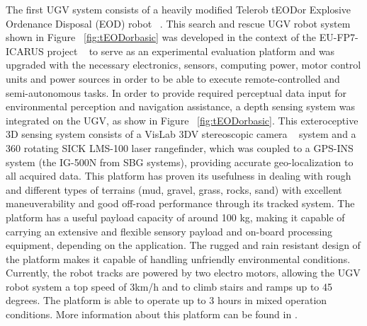 \documentclass{article}
\begin{document}
The first UGV system consists of a heavily modified Telerob tEODor Explosive Ordenance Disposal (EOD) robot ~\cite{EODTeodor}.
This search and rescue UGV robot system shown in Figure ~\ref{fig:tEODorbasic} was developed in the context of the EU-FP7-ICARUS project ~\cite{ICARUS} to serve as an experimental evaluation platform and was upgraded with the necessary  electronics,  sensors, computing power, motor control units and power sources in order to be able to execute remote-controlled and semi-autonomous tasks.
In order to provide required perceptual data input for environmental perception and navigation assistance, a depth sensing system was integrated on the UGV, as show in Figure ~\ref{fig:tEODorbasic}.
This exteroceptive 3D sensing system consists of a VisLab 3DV stereoscopic camera ~\cite{itsc2013} system and a 360 rotating SICK LMS-100 laser rangefinder, which was coupled to a GPS-INS system (the IG-500N from SBG systems), providing accurate geo-localization to all acquired data.
This platform has proven its usefulness in dealing with rough and different types of terrains (mud, gravel, grass, rocks, sand) with excellent maneuverability and good off-road performance through its tracked system.
The platform has a useful payload capacity of around 100 kg, making it capable of carrying an extensive and flexible sensory payload and on-board processing equipment, depending on the application.
The rugged and rain resistant design of the platform makes it capable of handling unfriendly environmental conditions.
Currently, the robot tracks are powered by two electro motors, allowing the UGV robot system a top speed of 3km/h and to climb stairs and ramps up to 45 degrees.
The platform is able to operate up to 3 hours in mixed operation conditions.
More information about this platform can be found in \cite{HarisPP} \cite{Haris2}.
\end{document}
